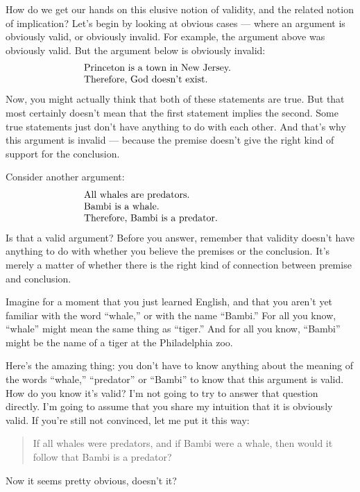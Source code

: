 How do we get our hands on this elusive notion of validity, and the
related notion of implication?  Let's begin by looking at obvious
cases --- where an argument is obviously valid, or obviously invalid.
For example, the argument above was obviously valid.  But the argument
below is obviously invalid:
\[ \begin{array}{p{7cm}}
  Princeton is a town in New Jersey.  \\ Therefore, God doesn't
  exist. \end{array} \] Now, you might actually think that both of these
statements are true.  But that most certainly doesn't mean that the
first statement implies the second.  Some true statements just don't
have anything to do with each other.  And that's why this argument is
invalid --- because the premise doesn't give the right kind of support
for the conclusion.

Consider another argument:
\[ \begin{array}{p{7cm}}
  All whales are predators. \\
  Bambi is a whale. \\
  Therefore, Bambi is a predator.
   \end{array} \]
 Is that a valid argument?  Before you answer, remember that validity
 doesn't have anything to do with whether you believe the premises or
 the conclusion.  It's merely a matter of whether there is the right
 kind of connection between premise and conclusion.

  Imagine for a moment that you just learned English, and that you
  aren't yet familiar with the word ``whale,'' or with the name
  ``Bambi.''  For all you know, ``whale'' might mean the same thing as
  ``tiger.''  And for all you know, ``Bambi'' might be the name of a
  tiger at the Philadelphia zoo.

  Here's the amazing thing: you don't have to know anything about the
 meaning of the words ``whale,'' ``predator'' or ``Bambi'' to know
 that this argument is valid.  How do you know it's valid?  I'm not
 going to try to answer that question directly.  I'm going to assume
 that you share my intuition that it is obviously valid.  If you're
 still not convinced, let me put it this way:
 \begin{quote} If all whales were predators, and if Bambi were a
   whale, then would it follow that Bambi is a predator?  \end{quote}
 Now it seems pretty obvious, doesn't it?

